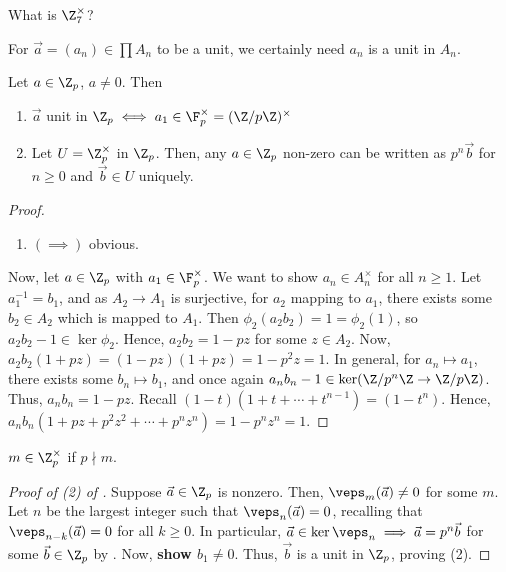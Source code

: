 \begin{notebox*}[Question]
    What is $\Z_7^\times$?
\end{notebox*}

For $\vec a = (a_n ) \in \prod A_n$ to be a unit, we certainly need $a_n$ is a unit in $A_n$.

\begin{thm}
    Let $a \in \Z_p$, $a \neq 0$. Then
    \begin{enumerate}
        \item $\vec a$ unit in $\Z_p \iff a_1 \in \F_p^\times = (\Z/p\Z)^\times$
        \item Let $U = \Z_p^\times$ in $\Z_p$.  Then, any $a \in \Z_p$ non-zero can be written as $p^n\vec b$ for $n \geq 0$ and $\vec b\in U$ uniquely.
    \end{enumerate}
\end{thm}

\begin{proof}
    \begin{enumerate}
        \item $( \implies)$ obvious.
    \end{enumerate}

    Now, let $a \in \Z_p$ with $a_1 \in \F_p^\times$. We want to show $a_n \in A_n^\times$ for all $n \geq 1$. Let $a_1^{-1}=b_1$, and as $A_2 \to A_1$ is surjective, for $a_2$ mapping to $a_1$, there exists some $b_2 \in A_2$ which is mapped to $A_1$. Then $\phi_2(a_2b_2)=1=\phi_2(1)$, so $a_2b_2-1 \in \ker \phi_2$. Hence, $a_2b_2 = 1-pz$ for some $z \in A_2$. Now, $a_2b_2(1+pz)=(1-pz)(1+pz)=1-p^2z=1$. In general, for $a_n \mapsto a_1$, there exists some $b_n \mapsto b_1$, and once again $a_nb_n-1 \in \ker(\Z/p^n\Z \to \Z/p\Z)$. Thus, $a_nb_n=1-pz$. Recall $(1-t)(1+t+\cdots +t^{n-1})=(1-t^n)$. Hence, $a_nb_n(1+pz+p^2z^2+\cdots +p^nz^n) = 1-p^nz^n=1$.
\end{proof}

\begin{cor}
    $m \in \Z_p^\times$ if $p \nmid m$.
\end{cor}

\begin{proof}[Proof of (2) of ]
    Suppose $\vec a \in \Z_p$ is nonzero. Then, $\veps_m(\vec a) \neq 0$ for some $m$. Let $n$ be the largest integer such that $\veps _n(\vec a)=0$, recalling that $\veps_{n-k}(\vec a)=0$ for all $k \geq 0$. In particular, $\vec a \in \ker \veps _n \implies \vec a = p^n\vec b$ for some $\vec b \in \Z_p$ by . Now, \textbf{show $b_1 \neq 0$}. Thus, $\vec b$ is a unit in $\Z_p$, proving (2).
\end{proof}

